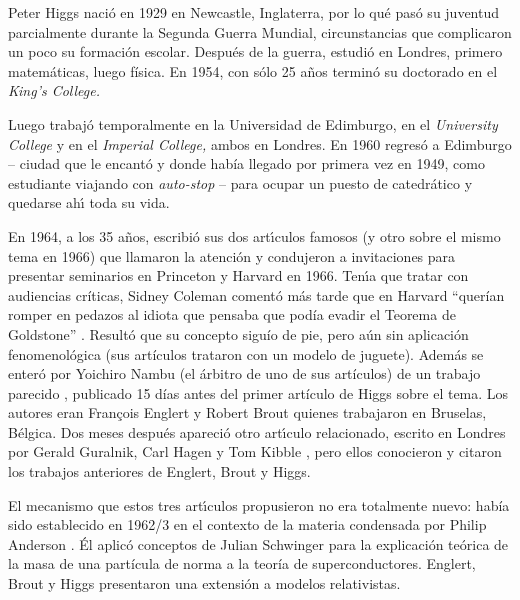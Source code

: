 Peter Higgs naci\'o en 1929 en Newcastle, Inglaterra, por lo qu\'e
pas\'{o} su juventud parcialmente durante la Segunda Guerra Mundial,
circunstancias que complicaron un poco su formaci\'on escolar.
Despu\'es de la guerra, estudi\'o en Londres, primero matem\'aticas,
luego f\'isica. En 1954, con s\'olo 25 a\~nos termin\'o su
doctorado en el {\it King's College.}

Luego trabaj\'{o} temporalmente en la Universidad de Edimburgo,
en el {\it University College} y en el {\it Imperial College,} ambos
en Londres.
En 1960 regres\'{o} a Edimburgo -- ciudad que le encant\'o y donde
hab\'ia llegado por primera vez en 1949, como estudiante viajando
con {\it auto-stop} -- para ocupar un puesto de catedr\'{a}tico y
quedarse ah\'{\i} toda su vida.

En 1964, a los 35 a\~{n}os, escribi\'o sus dos art\'{\i}culos famosos
(y otro sobre el mismo tema en 1966) \cite{Higgs} que llamaron la
atenci\'{o}n y condujeron a invitaciones para presentar seminarios en
Princeton y Harvard en 1966. Ten\'{\i}a que tratar con audiencias cr\'iticas,
Sidney Coleman coment\'{o} m\'{a}s tarde que en Harvard ``quer\'ian
romper en pedazos al idiota que pensaba que pod\'ia evadir el
Teorema de Goldstone'' \cite{boson}. Result\'{o} que su concepto sigu\'io
de pie, pero a\'un sin aplicaci\'{o}n fenomenol\'{o}gica
(sus art\'iculos trataron con un modelo de juguete). Adem\'{a}s
se enter\'{o} por Yoichiro Nambu (el \'arbitro de uno de sus
art\'iculos) de un trabajo parecido \cite{EB}, publicado
15 d\'ias antes del primer art\'iculo de Higgs sobre el tema.
Los autores eran Fran\c{c}ois Englert y Robert Brout quienes
trabajaron en Bruselas, B\'elgica. Dos meses despu\'{e}s apareci\'{o}
otro art\'{\i}culo relacionado, escrito en Londres por
Gerald Guralnik, Carl Hagen y Tom Kibble \cite{GHK}, pero ellos
conocieron y citaron los trabajos anteriores de Englert, Brout y Higgs.



El mecanismo que estos tres art\'{\i}culos propusieron no era
totalmente nuevo: hab\'ia sido establecido en 1962/3 en el contexto de la
materia condensada por Philip Anderson \cite{Anderson}. \'El aplic\'o
conceptos de Julian Schwinger \cite{Schwinger} para la explicaci\'on
te\'orica de la masa de una part\'icula de norma a la teor\'ia de
superconductores. Englert, Brout y Higgs presentaron una
extensi\'on a modelos relativistas.

